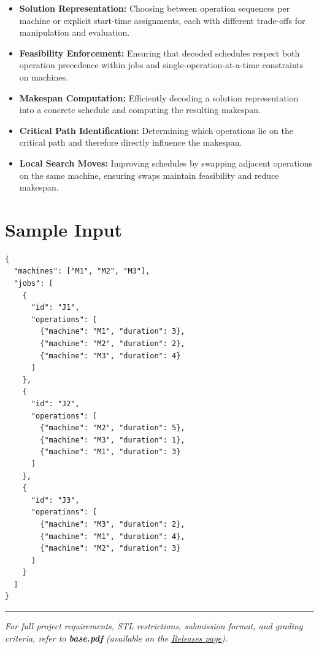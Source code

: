 \begin{itemize}
  \item \textbf{Solution Representation:} Choosing between operation sequences per machine or explicit start-time assignments, each with different trade-offs for manipulation and evaluation.
  \item \textbf{Feasibility Enforcement:} Ensuring that decoded schedules respect both operation precedence within jobs and single-operation-at-a-time constraints on machines.
  \item \textbf{Makespan Computation:} Efficiently decoding a solution representation into a concrete schedule and computing the resulting makespan.
  \item \textbf{Critical Path Identification:} Determining which operations lie on the critical path and therefore directly influence the makespan.
  \item \textbf{Local Search Moves:} Improving schedules by swapping adjacent operations on the same machine, ensuring swaps maintain feasibility and reduce makespan.
\end{itemize}

\section{Sample Input}

\begin{lstlisting}[style=json, caption={data/input\_sample.json}]
{
  "machines": ["M1", "M2", "M3"],
  "jobs": [
    {
      "id": "J1",
      "operations": [
        {"machine": "M1", "duration": 3},
        {"machine": "M2", "duration": 2},
        {"machine": "M3", "duration": 4}
      ]
    },
    {
      "id": "J2",
      "operations": [
        {"machine": "M2", "duration": 5},
        {"machine": "M3", "duration": 1},
        {"machine": "M1", "duration": 3}
      ]
    },
    {
      "id": "J3",
      "operations": [
        {"machine": "M3", "duration": 2},
        {"machine": "M1", "duration": 4},
        {"machine": "M2", "duration": 3}
      ]
    }
  ]
}
\end{lstlisting}

\vfill
\noindent\rule{\textwidth}{0.4pt}
{\small\textit{For full project requirements, STL restrictions, submission format, and grading criteria, refer to \textbf{base.pdf} (available on the \href{https://github.com/BestSithInEU/cse211-term-projects/releases}{Releases page}).}}

